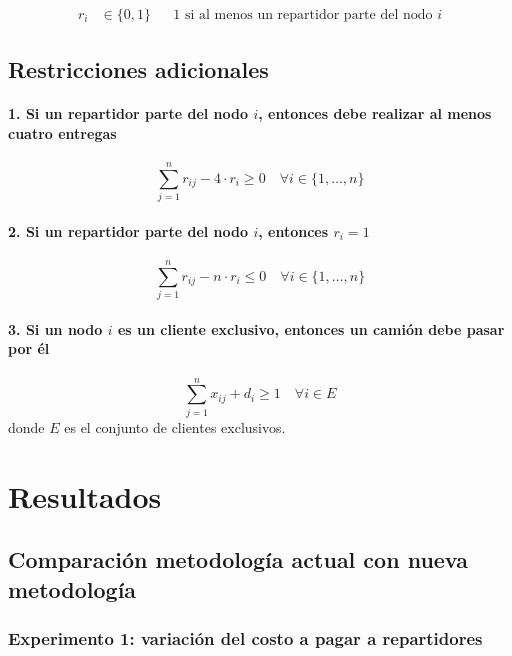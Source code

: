 \documentclass{article}
\begin{document}
\begin{align*}
    r_{i} &\in \{0,1\} && \text{1 si al menos un repartidor parte del nodo } i 
\end{align*}

\subsection*{Restricciones adicionales}

\paragraph{1. Si un repartidor parte del nodo $i$, entonces debe realizar al menos cuatro entregas}
\[
\sum_{j=1}^{n} r_{ij} - 4 \cdot r_{i} \geq 0 \quad \forall i \in \{1, \dots, n\}
\]

\paragraph{2. Si un repartidor parte del nodo $i$, entonces $r_i = 1$}
\[
\sum_{j=1}^{n} r_{ij} - n \cdot r_{i} \leq 0 \quad \forall i \in \{1, \dots, n\}
\]

\paragraph{3. Si un nodo $i$ es un cliente exclusivo, entonces un camión debe pasar por él}
\[
\sum_{j=1}^{n} x_{ij} + d_{i} \geq 1 \quad \forall i \in E
\]
donde $E$ es el conjunto de clientes exclusivos.


\section{Resultados}

\subsection{Comparación metodología actual con nueva metodología} 

\subsubsection{Experimento 1: variación del costo a pagar a repartidores}
\end{document}
